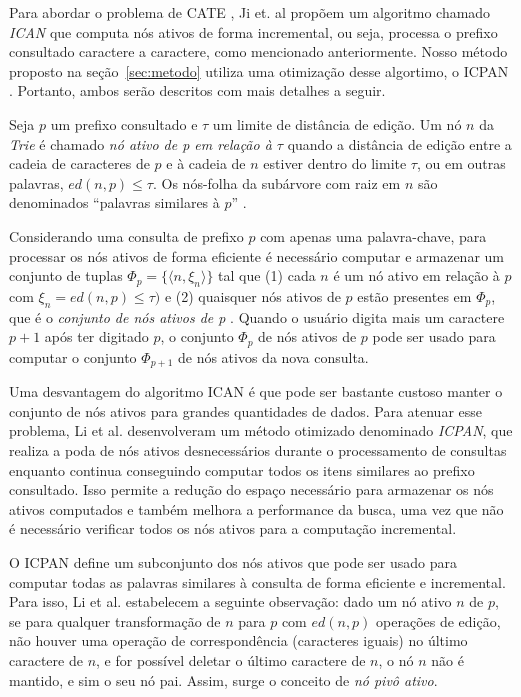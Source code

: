 Para abordar o problema de CATE , Ji et. al \citep{ji2009efficient} propõem um algoritmo chamado \textit{ICAN} que computa nós ativos de forma incremental, ou seja, processa o prefixo consultado caractere a caractere, como mencionado anteriormente. Nosso método proposto na seção~\ref{sec:metodo} utiliza uma otimização desse algortimo, o ICPAN \citep{li2011efficient}. Portanto, ambos serão descritos com mais detalhes a seguir. 

Seja $p$ um prefixo consultado e $\tau$ um limite de distância de edição. Um nó $n$ da \textit{Trie} é chamado \textit{nó ativo de p em relação à $\tau$} quando a distância de edição entre a cadeia de caracteres de $p$ e à cadeia de $n$ estiver dentro do limite $\tau$, ou em outras palavras, $ed(n, p) \leq \tau$. Os nós-folha da subárvore com raiz em $n$ são denominados ``palavras similares à $p$'' \citep{ji2009efficient}. 

Considerando uma consulta de prefixo $p$ com apenas uma palavra-chave, para processar os nós ativos de forma eficiente é necessário computar e armazenar um conjunto de tuplas $\Phi_{p} = \{ \langle n, \xi_{n} \rangle \}$ tal que (1) cada $n$ é um nó ativo em relação à $p$ com $\xi_{n} = ed(n, p) \leq \tau)$ e (2) quaisquer nós ativos de $p$ estão presentes em $\Phi_{p}$, que é o \textit{conjunto de nós ativos de p} \citep{ji2009efficient}. Quando o usuário digita mais um caractere $p + 1$ após ter digitado $p$, o conjunto $\Phi_{p}$ de nós ativos de $p$ pode ser usado para computar o conjunto $\Phi_{p + 1}$ de nós ativos da nova consulta.

Uma desvantagem do algoritmo ICAN é que pode ser bastante custoso manter o conjunto de nós ativos para grandes quantidades de dados. Para atenuar esse problema, Li et al. \citep{li2011efficient} desenvolveram um método otimizado denominado \textit{ICPAN}, que realiza a poda de nós ativos desnecessários durante o processamento de consultas enquanto continua conseguindo computar todos os itens similares ao prefixo consultado. Isso permite a redução do espaço necessário para armazenar os nós ativos computados e também melhora a performance da busca, uma vez que não é necessário verificar todos os nós ativos para a computação incremental.

O ICPAN define um subconjunto dos nós ativos que pode ser usado para computar todas as palavras similares à consulta de forma eficiente e incremental. Para isso, Li et al. \citep{li2011efficient} estabelecem a seguinte observação: dado um nó ativo $n$ de $p$, se para qualquer transformação de $n$ para $p$ com $ed(n,p)$ operações de edição, não houver uma operação de correspondência (caracteres iguais) no último caractere de $n$, e for possível deletar o último caractere de $n$, o nó $n$ não é mantido, e sim o seu nó pai. Assim, surge o conceito de \textit{nó pivô ativo}.

